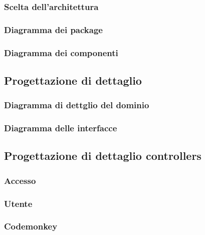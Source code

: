 \documentclass{article}
\begin{document}
\subsubsection{Scelta dell'architettura}

\subsubsection{Diagramma dei package}

\subsubsection{Diagramma dei componenti}


\subsection{Progettazione di dettaglio}
\subsubsection{Diagramma di dettglio del dominio}

\subsubsection{Diagramma delle interfacce}


\subsection{Progettazione di dettaglio controllers}
\subsubsection{Accesso}

\subsubsection{Utente}

\subsubsection{Codemonkey}

\end{document}
